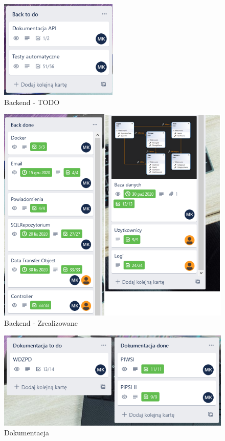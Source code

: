 \documentclass[12pt,a4paper]{article}
\begin{document}
		\begin{figure}[H]
			\centering
			\includegraphics[width=0.5\textwidth]{img/backend_niedokonczony.png}
			\caption{Backend - TODO}
			\label{fig:trello-backend-to-do}
		\end{figure}
			\begin{figure}[H]
			\centering
			\includegraphics[width=\textwidth]{img/backend_done.png}
			\caption{Backend - Zrealizowane}
			\label{fig:trello-backend-done}
		\end{figure}
		\begin{figure}[H]
			\centering
			\includegraphics[width=\textwidth]{img/dokumentacja.png}
			\caption{Dokumentacja}
			\label{fig:trello-doc}
		\end{figure}
\end{document}
